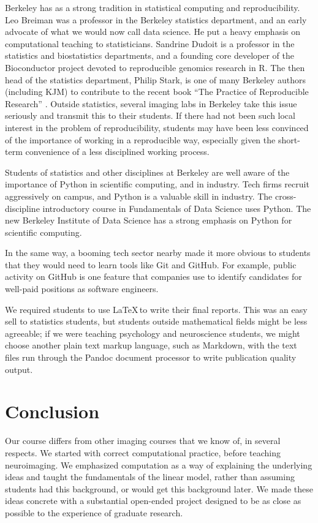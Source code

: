 Berkeley has as a strong tradition in statistical computing and
reproducibility.  Leo Breiman was a professor in the Berkeley statistics
department, and an early advocate of what we would now call data science.  He
put a heavy emphasis on computational teaching to statisticians.  Sandrine
Dudoit is a professor in the statistics and biostatistics departments, and a
founding core developer of the Bioconductor project devoted to reproducible
genomics research in R.  The then head of the statistics department, Philip
Stark, is one of many Berkeley authors (including KJM) to contribute to the
recent book ``The Practice of Reproducible Research''
\citep{kitzes2017practice}. Outside statistics, several imaging labs in
Berkeley take this issue seriously and transmit this to their students.  If
there had not been such local interest in the problem of reproducibility,
students may have been less convinced of the importance of
working in a reproducible way, especially given the short-term convenience
of a less disciplined working process.

Students of statistics and other disciplines at Berkeley are well aware of the
importance of Python in scientific computing, and in industry.  Tech firms
recruit aggressively on campus, and Python is a valuable skill in industry.
The cross-discipline introductory course in Fundamentals of Data Science uses
Python. The new Berkeley Institute of Data Science has a strong emphasis
on Python for scientific computing.

In the same way, a booming tech sector nearby made it more obvious to students
that they would need to learn tools like Git and GitHub.
For example, public activity on GitHub is one
feature that companies use to identify candidates for well-paid positions as
software engineers.

We required students to use \LaTeX\,to write their final reports.  This was an
easy sell to statistics students, but students outside mathematical fields
might be less agreeable; if we were teaching psychology and neuroscience
students, we might choose another plain text markup language, such as
Markdown, with the text files run through the Pandoc document processor to
write publication quality output.

\section*{Conclusion}

Our course differs from other imaging courses that we know of, in several
respects.  We started with correct computational practice, before teaching
neuroimaging.  We emphasized computation as a way of explaining the underlying
ideas and taught the fundamentals of the linear model, rather than assuming
students had this background, or would get this background later.
We made these ideas concrete with a substantial open-ended project designed to
be as close as possible to the experience of graduate research.


